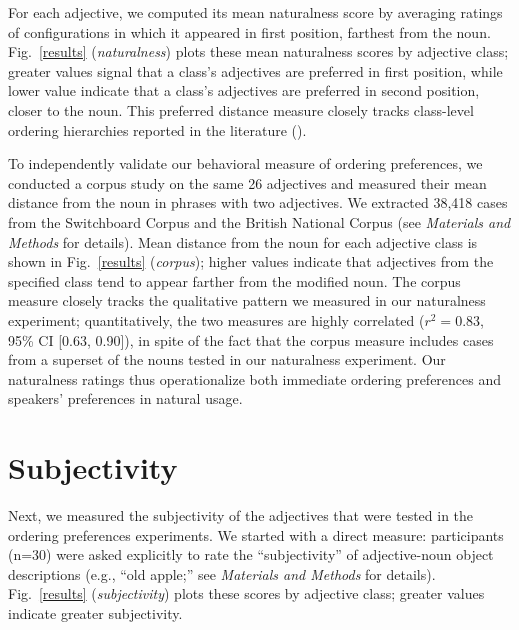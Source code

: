 \documentclass{pnastwo}
\newcommand{\ndg}[1]{\textcolor{Green}{[ndg: #1]}}
\begin{document}
\begin{article}
For each adjective, we computed its mean naturalness score by averaging ratings of configurations in which it appeared in first position, farthest from the noun. Fig.\ \ref{results} (\emph{naturalness}) plots these mean naturalness scores by adjective class; greater values signal that a class's adjectives are preferred in first position, while lower value indicate that a class's adjectives are preferred in second position, closer to the noun. This preferred distance measure closely tracks class-level ordering hierarchies reported in the literature (\cite{dixon1982,sproatshih1991}).

To independently validate our behavioral measure of ordering preferences, we conducted a corpus study on the same 26 adjectives and measured their mean distance from the noun in phrases with two adjectives. We extracted 38,418 cases from the Switchboard Corpus and the British National Corpus (see \emph{Materials and Methods} for details). Mean distance from the noun for each adjective class is shown in Fig.~\ref{results} (\emph{corpus}); higher values indicate that adjectives from the specified class tend to appear farther from the modified noun. The corpus measure closely tracks the qualitative pattern we measured in our naturalness experiment; quantitatively, the two measures are highly correlated ($r^{2}=0.83$, 95\% CI [0.63, 0.90]), in spite of the fact that the corpus measure includes cases from a superset of the nouns tested in our naturalness experiment. Our naturalness ratings thus operationalize both immediate ordering preferences and speakers' preferences in natural usage.


\section{Subjectivity}

Next, we measured the subjectivity of the adjectives that were tested in the ordering preferences experiments. We started with a direct measure: participants (n=30) were asked explicitly to rate the ``subjectivity'' of adjective-noun object descriptions (e.g.,  ``old apple;'' see \emph{Materials and Methods} for details).
Fig.\ \ref{results} (\emph{subjectivity}) plots these scores by adjective class; greater values indicate greater subjectivity.


\end{article}
\end{document}
